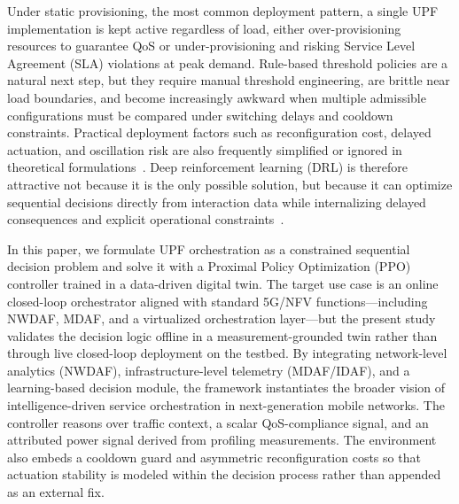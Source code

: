 \documentclass[a4paper,fleqn]{cas-sc}
\begin{document}
Under static provisioning, the most common deployment pattern, a single UPF implementation is kept active regardless of load, either over-provisioning resources to guarantee QoS or under-provisioning and risking Service Level Agreement (SLA) violations at peak demand. Rule-based threshold policies are a natural next step, but they require manual threshold engineering, are brittle near load boundaries, and become increasingly awkward when multiple admissible configurations must be compared under switching delays and cooldown constraints. Practical deployment factors such as reconfiguration cost, delayed actuation, and oscillation risk are also frequently simplified or ignored in theoretical formulations~\cite{soto2021sds,tournaire2019mascots}. Deep reinforcement learning (DRL) is therefore attractive not because it is the only possible solution, but because it can optimize sequential decisions directly from interaction data while internalizing delayed consequences and explicit operational constraints~\cite{pei2020jsac,luong2019comst}.

In this paper, we formulate UPF orchestration as a constrained sequential decision problem and solve it with a Proximal Policy Optimization (PPO) controller trained in a data-driven digital twin. The target use case is an online closed-loop orchestrator aligned with standard 5G/NFV functions---including NWDAF, MDAF, and a virtualized orchestration layer---but the present study validates the decision logic offline in a measurement-grounded twin rather than through live closed-loop deployment on the testbed. By integrating network-level analytics (NWDAF), infrastructure-level telemetry (MDAF/IDAF), and a learning-based decision module, the framework instantiates the broader vision of intelligence-driven service orchestration in next-generation mobile networks. The controller reasons over traffic context, a scalar QoS-compliance signal, and an attributed power signal derived from profiling measurements. The environment also embeds a cooldown guard and asymmetric reconfiguration costs so that actuation stability is modeled within the decision process rather than appended as an external fix.
\end{document}
